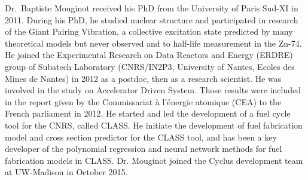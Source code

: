 \documentclass[dvips,12pt]{article}
\begin{document}
Dr.\ Baptiste Mouginot received his PhD from the University of Paris
Sud-XI in 2011. During his PhD, he studied nuclear structure and
participated in research of the Giant Pairing Vibration, a collective
excitation state predicted by many theoretical models but never
observed and to half-life measurement in the Zn-74. He joined the
Experimental Research on Data Reactors and Energy (ERDRE) group of
Subatech Laboratory (CNRS/IN2P3, University of Nantes, Ecoles des
Mines de Nantes) in 2012 as a postdoc, then as a research
scientist. He was involved in the study on Accelerator Driven
System. Those results were included in the report given by the
Commissariat à l’énergie atomique (CEA) to the French parliament in
2012. He started and led the development of a fuel cycle tool for the
CNRS, called CLASS. He initiate the development of fuel fabrication
model and cross section predictor for the CLASS tool, and has been a
key developer of the polynomial regression and neural network methods
for fuel fabrication models in CLASS.  Dr. Mouginot joined the Cyclus
development team at UW-Madison in October 2015.


\label{LastPage}
\end{document}
